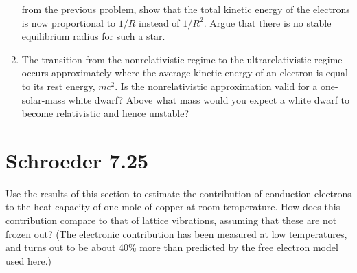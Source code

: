 \documentclass[10pt]{article}
\begin{document}
\begin{enumerate}[label=\alph*)]
			from the previous problem, show that the total kinetic energy of the electrons is now 
			proportional to \( 1 / R \) instead of \( 1 / R^2 \). Argue that there is no stable 
			equilibrium radius for such a star.
		\item The transition from the nonrelativistic regime to the ultrarelativistic regime occurs 
			approximately where the average kinetic energy of an electron is equal to its rest energy, 
			\( mc^2 \). Is the nonrelativistic approximation valid for a one-solar-mass white dwarf? Above
			what mass would you expect a white dwarf to become relativistic and hence unstable?
	\end{enumerate}

	\pagebreak
	\section*{Schroeder 7.25}
	Use the results of this section to estimate the contribution of conduction electrons to the heat capacity 
	of one mole of copper at room temperature. How does this contribution compare to that of 
	lattice vibrations, assuming that these are not frozen out? (The electronic contribution has been measured
	at low temperatures, and turns out to be about 40\% more than predicted by the free electron model 
	used here.) 
\end{document}
